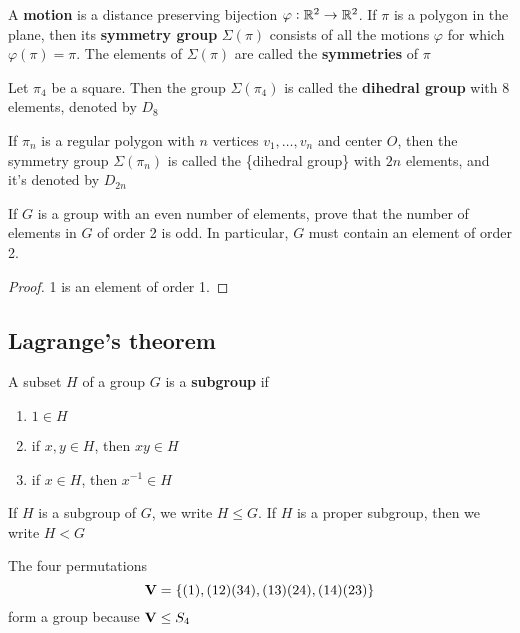 \documentclass[11pt]{article}
\begin{document}
\begin{definition}[]
A \textbf{motion} is a distance preserving bijection \(\varphi:\mathbb{R}^2\to\mathbb{R}^2\). If
\(\pi\) is a polygon in the plane, then its \textbf{symmetry group} \(\Sigma(\pi)\)
consists of all the motions \(\varphi\) for which \(\varphi(\pi)=\pi\). The
elements of \(\Sigma(\pi)\) are called the \textbf{symmetries} of \(\pi\)
\end{definition}

Let \(\pi_4\) be a square. Then the group \(\Sigma(\pi_4)\) is called the
\textbf{dihedral group} with 8 elements, denoted by \(D_8\)

\begin{definition}[]
If \(\pi_n\) is a regular polygon with \(n\) vertices \(v_1,\dots,v_n\) and center
\(O\), then the symmetry group \(\Sigma(\pi_n)\) is called the \tf\{dihedral
group\} with \(2n\) elements, and it's denoted by \(D_{2n}\)
\end{definition}

\begin{exercise}
\label{ex2.27}
If \(G\) is a group with an even number of elements, prove that the number of
elements in \(G\) of order 2 is odd. In particular, \(G\) must contain an element of
order 2.
\end{exercise}

\begin{proof}
1 is an element of order 1.
\end{proof}
\subsection{Lagrange's theorem}
\label{sec:org4d9e403}
\begin{definition}[]
A subset \(H\) of a group \(G\) is a \textbf{subgroup} if
\begin{enumerate}
\item \(1\in H\)
\item if \(x,y\in H\), then \(xy\in H\)
\item if \(x\in H\), then \(x^{-1}\in H\)
\end{enumerate}
\end{definition}

If \(H\) is a subgroup of \(G\), we write \(H\le G\). If \(H\) is a proper subgroup,
then we write \(H<G\)

The four permutations
\begin{equation*}
\operatorname{\textbf{V}}=\{(1),(1 2)(3 4),(1 3)(2 4),(1 4)(2 3)\}
\end{equation*}
form a group because \(\operatorname{\textbf{V}}\le S_4\)
\end{document}
